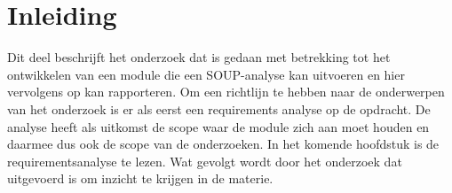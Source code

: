 
\chapter{Inleiding}\label{ch:inleiding3} %

Dit deel beschrijft het onderzoek dat is gedaan met betrekking tot het ontwikkelen van een module die een SOUP-analyse kan uitvoeren en hier vervolgens op kan rapporteren. Om een richtlijn te hebben naar de onderwerpen van het onderzoek is er als eerst een requirements analyse op de opdracht. De analyse heeft als uitkomst de scope waar de module zich aan moet houden en daarmee dus ook de scope van de onderzoeken. In het komende hoofdstuk is de requirementsanalyse te lezen. Wat gevolgt wordt door het onderzoek dat uitgevoerd is om inzicht te krijgen in de materie.

